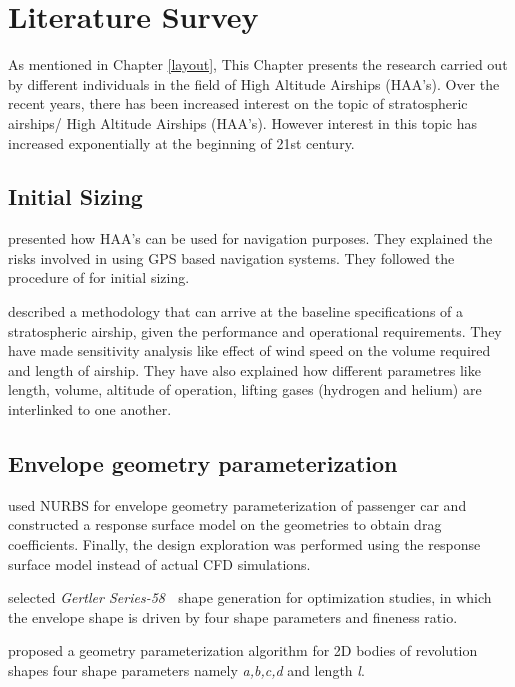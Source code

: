 
\chapter{Literature Survey}
\label{literature}
As mentioned in Chapter \ref{layout}, This Chapter presents the research carried out by different individuals in the field of High Altitude Airships (HAA's).
Over the recent years, there has been increased interest on the topic of stratospheric airships/ High Altitude Airships (HAA's). However interest in this topic has increased exponentially at the beginning of 21st century.

\section{Initial Sizing}

\cite{Gawale2005} presented how HAA's can be used for navigation purposes. They explained the risks involved in using GPS based navigation systems. They followed the procedure of \cite{Rehmet2000} for initial sizing.

\cite{alam2014mdo} described a methodology that can arrive at the baseline specifications of a stratospheric airship, given the performance and operational requirements. They have made sensitivity analysis like effect of wind speed on the volume required and length of airship. They have also explained how different parametres like length, volume, altitude of operation, lifting gases (hydrogen and helium) are interlinked to one another.

\section{Envelope geometry parameterization}


\cite{OsamaAbdulGhani2013} used NURBS for envelope geometry parameterization of passenger car and constructed a response surface model on the geometries to obtain drag coefficients. Finally, the design exploration was performed using the response surface model instead of actual CFD simulations.

\cite{alam2016mdo} selected \textit{Gertler Series-58} $ \; $  shape generation for optimization studies, in which the envelope shape is driven by four shape parameters and fineness ratio.

\cite{Wang2010} proposed a geometry parameterization algorithm for 2D bodies of revolution shapes four shape parameters namely \textit{a,b,c,d} and length \textit{l}.
 
